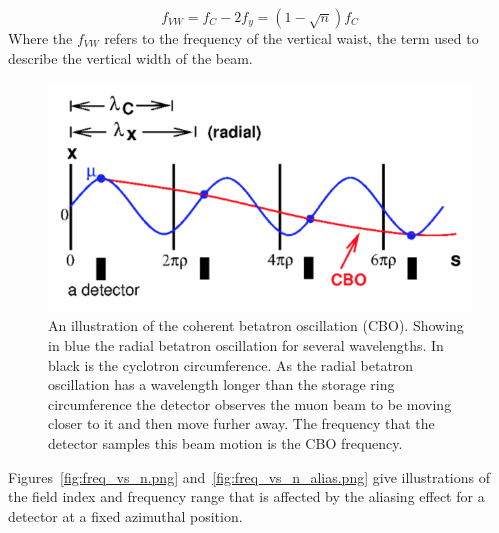 \begin{equation}
f_{VW} = f_{C} - 2f_{y} = (1 - \sqrt{n})f_{C}
\end{equation}
\noindent
Where the $f_{VW}$ refers to the frequency of the vertical waist, the term used to describe the vertical width of the beam.

\begin{figure}[th]
\centering
\includegraphics[scale=1.0]{Figures/CBOdiagram.png}
\decoRule
\caption{ An illustration of the coherent betatron oscillation (CBO). Showing in blue the radial betatron oscillation for several wavelengths. In black is the cyclotron circumference. As the radial betatron oscillation has a wavelength longer than the storage ring circumference the detector observes the muon beam to be moving closer to it and then move furher away. The frequency that the detector samples this beam motion is the CBO frequency.\cite{Reference29}}
\label{fig:CBOdiagram}
\end{figure}
Figures~\ref{fig:freq_vs_n.png} and~\ref{fig:freq_vs_n_alias.png} give illustrations of the field index and frequency range that is affected by the aliasing effect for a detector at a fixed azimuthal position. 

